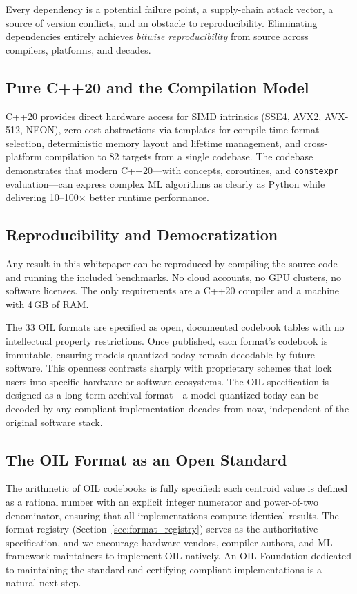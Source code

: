 Every dependency is a potential failure point, a supply-chain attack vector, a source of version conflicts, and an obstacle to reproducibility. Eliminating dependencies entirely achieves \textit{bitwise reproducibility} from source across compilers, platforms, and decades.

\subsection{Pure C++20 and the Compilation Model}

C++20 provides direct hardware access for SIMD intrinsics (SSE4, AVX2, AVX-512, NEON), zero-cost abstractions via templates for compile-time format selection, deterministic memory layout and lifetime management, and cross-platform compilation to 82 targets from a single codebase. The codebase demonstrates that modern C++20---with concepts, coroutines, and \texttt{constexpr} evaluation---can express complex ML algorithms as clearly as Python while delivering 10--100$\times$ better runtime performance.

\subsection{Reproducibility and Democratization}

Any result in this whitepaper can be reproduced by compiling the source code and running the included benchmarks. No cloud accounts, no GPU clusters, no software licenses. The only requirements are a C++20 compiler and a machine with 4\,GB of RAM.

The 33 OIL formats are specified as open, documented codebook tables with no intellectual property restrictions. Once published, each format's codebook is immutable, ensuring models quantized today remain decodable by future software. This openness contrasts sharply with proprietary schemes that lock users into specific hardware or software ecosystems. The OIL specification is designed as a long-term archival format---a model quantized today can be decoded by any compliant implementation decades from now, independent of the original software stack.

\subsection{The OIL Format as an Open Standard}

The arithmetic of OIL codebooks is fully specified: each centroid value is defined as a rational number with an explicit integer numerator and power-of-two denominator, ensuring that all implementations compute identical results. The format registry (Section~\ref{sec:format_registry}) serves as the authoritative specification, and we encourage hardware vendors, compiler authors, and ML framework maintainers to implement OIL natively. An OIL Foundation dedicated to maintaining the standard and certifying compliant implementations is a natural next step.

